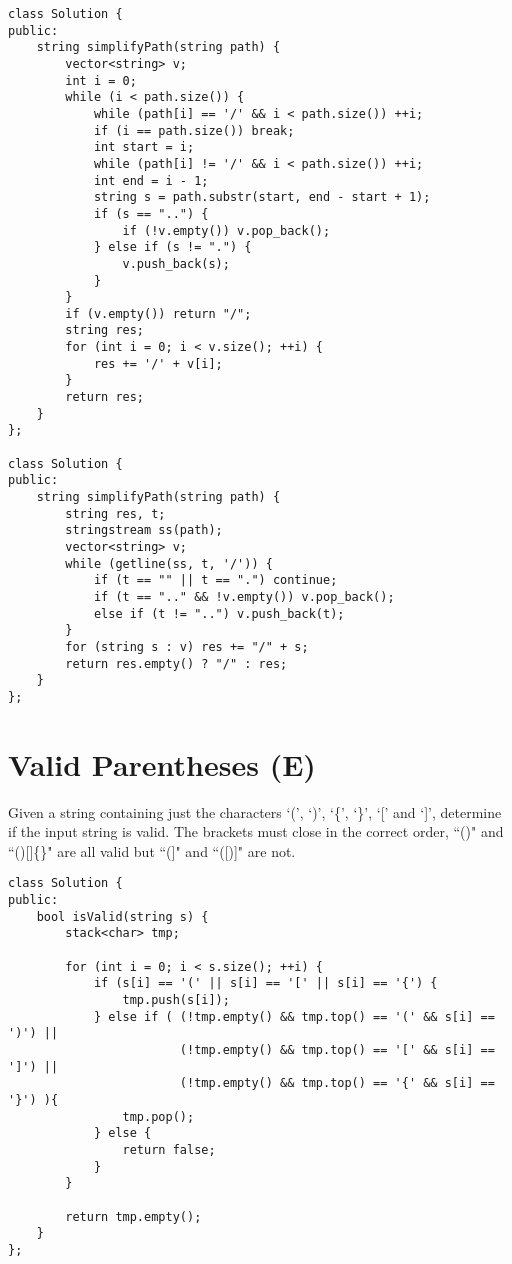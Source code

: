 \begin{lstlisting}
class Solution {
public:
    string simplifyPath(string path) {
        vector<string> v;
        int i = 0;
        while (i < path.size()) {
            while (path[i] == '/' && i < path.size()) ++i;
            if (i == path.size()) break;
            int start = i;
            while (path[i] != '/' && i < path.size()) ++i;
            int end = i - 1;
            string s = path.substr(start, end - start + 1);
            if (s == "..") {
                if (!v.empty()) v.pop_back(); 
            } else if (s != ".") {
                v.push_back(s);
            }
        }
        if (v.empty()) return "/";
        string res;
        for (int i = 0; i < v.size(); ++i) {
            res += '/' + v[i];
        }
        return res;
    }
};

class Solution {
public:
    string simplifyPath(string path) {
        string res, t;
        stringstream ss(path);
        vector<string> v;
        while (getline(ss, t, '/')) {
            if (t == "" || t == ".") continue;
            if (t == ".." && !v.empty()) v.pop_back();
            else if (t != "..") v.push_back(t);
        }
        for (string s : v) res += "/" + s;
        return res.empty() ? "/" : res;
    }
};
\end{lstlisting}


\section{Valid Parentheses (E)}
Given a string containing just the characters `(', `)', `\{', `\}', `[' and `]', determine if the input string is valid. The brackets must close in the correct order, ``()" and ``()[]\{\}" are all valid but ``(]" and ``([)]" are not.\\

\begin{lstlisting}
class Solution {
public:
    bool isValid(string s) {
        stack<char> tmp;
        
        for (int i = 0; i < s.size(); ++i) {
            if (s[i] == '(' || s[i] == '[' || s[i] == '{') {
                tmp.push(s[i]);
            } else if ( (!tmp.empty() && tmp.top() == '(' && s[i] == ')') ||
                        (!tmp.empty() && tmp.top() == '[' && s[i] == ']') ||                                               
                        (!tmp.empty() && tmp.top() == '{' && s[i] == '}') ){
                tmp.pop();
            } else {
                return false;
            }
        }
        
        return tmp.empty();
    }
};
\end{lstlisting}



